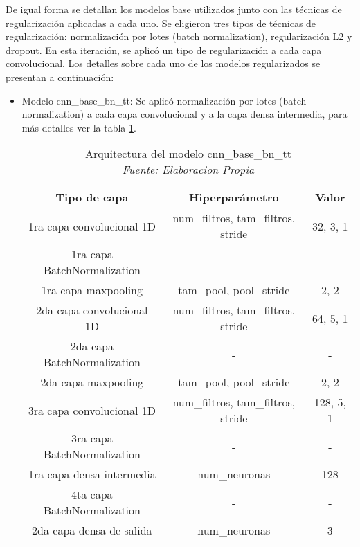 De igual forma se detallan los modelos base utilizados junto con las técnicas de regularización aplicadas a cada uno. Se eligieron tres tipos de técnicas de regularización: normalización por lotes (batch normalization), regularización L2 y dropout. En esta iteración, se aplicó un tipo de regularización a cada capa convolucional. Los detalles  sobre cada uno de los modelos regularizados se presentan a continuación:

\begin{itemize}
	
	\item Modelo cnn\_base\_bn\_tt: Se aplicó normalización por lotes (batch normalization) a cada capa convolucional y a la capa densa intermedia, para más detalles ver la tabla \ref{tbl:cnn_base_bn_tt}.
	
	\begin{table}[!ht]
		\centering
		\begin{tabular}{|c|c|c|}
			\hline
			\textbf{Tipo de capa} & \textbf{Hiperparámetro} & \textbf{Valor} \\ \hline
			1ra capa convolucional 1D & num\_filtros, tam\_filtros, stride & 32, 3, 1 \\ \hline
			1ra capa BatchNormalization & - & - \\ \hline
			1ra capa maxpooling & tam\_pool, pool\_stride & 2, 2 \\ \hline
			2da capa convolucional 1D & num\_filtros, tam\_filtros, stride & 64, 5, 1 \\ \hline
			2da capa BatchNormalization & - & - \\ \hline
			2da capa maxpooling & tam\_pool, pool\_stride & 2, 2 \\ \hline
			3ra capa convolucional 1D & num\_filtros, tam\_filtros, stride & 128, 5, 1 \\ \hline
			3ra capa BatchNormalization & - & - \\ \hline
			1ra capa densa intermedia & num\_neuronas & 128 \\ \hline
			4ta capa BatchNormalization & - & - \\ \hline
			2da capa densa de salida & num\_neuronas & 3 \\ \hline
		\end{tabular}
		\caption[Arquitectura del modelo cnn\_base\_bn\_tt]{Arquitectura del modelo cnn\_base\_bn\_tt
			\\\textit{Fuente: Elaboracion Propia}}
		\label{tbl:cnn_base_bn_tt}
	\end{table}
	

\end{itemize}
